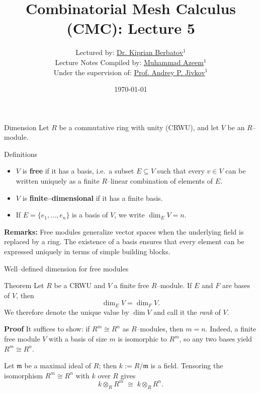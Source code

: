 \documentclass[11pt,aspectratio=43,ignorenonframetext,t]{beamer}
\title{Combinatorial Mesh Calculus (CMC): Lecture 5}
\author{Lectured by: \href{https://scholar.google.com/citations?user=x4R-snQAAAAJ&hl=en}{Dr. Kiprian Berbatov}$^1$\\
\smallskip
Lecture Notes Compiled by: \href{https://scholar.google.com/citations?user=CoIpITkAAAAJ&hl=en}{Muhammad Azeem}$^1$\\
\smallskip
Under the supervision of: \href{https://scholar.google.co.uk/citations?user=3nWJe5wAAAAJ&hl=en}{Prof. Andrey P. Jivkov}$^1$\\
\smallskip {\tiny $^1$Department of Mechanical and Aerospace Engineering, The University of Manchester, Oxford Road, Manchester M13 9PL, UK}
}
\date{\today}
\begin{document}
\begin{frame}
  \titlepage
\end{frame}

\begin{frame}{Dimension}
Let $R$ be a commutative ring with unity (CRWU), and let $V$ be an $R$–module.

\begin{block}{Definitions}
\begin{itemize}
  \item $V$ is \textbf{free} if it has a basis, i.e.\ a subset $E\subseteq V$ such that every $v\in V$ can be written uniquely as a finite $R$–linear combination of elements of $E$.
  \item $V$ is \textbf{finite–dimensional} if it has a finite basis.
  \item If $E=\{e_1,\dots,e_n\}$ is a basis of $V$, we write $\dim_E V = n$.
\end{itemize}
\end{block}

\textbf{Remarks:} Free modules generalize vector spaces when the underlying field is replaced by a ring. The existence of a basis ensures that every element can be expressed uniquely in terms of simple building blocks.

\end{frame}


\begin{frame}{Well–defined dimension for free modules}


\begin{block}{Theorem }
Let $R$ be a CRWU and $V$ a finite free $R$–module. If $E$ and $F$ are bases of $V$, then
\[
\dim_E V = \dim_F V.
\]
We therefore denote the unique value by $\dim V$ and call it the \emph{rank} of $V$.
\end{block}
\textbf{Proof}
It suffices to show: if $R^m \cong R^n$ as $R$–modules, then $m=n$.
Indeed, a finite free module $V$ with a basis of size $m$ is isomorphic to $R^m$, so any two bases yield $R^m \cong R^n$.

Let $\mathfrak m$ be a maximal ideal of $R$; then $k:=R/\mathfrak m$ is a field. Tensoring the isomorphism $R^m \cong R^n$ with $k$ over $R$ gives
\[
k \otimes_R R^m \;\cong\; k \otimes_R R^n.
\]
\end{frame}
\end{document}
